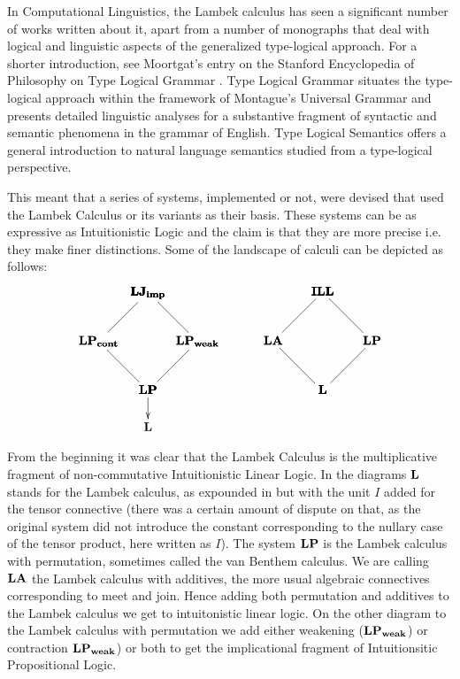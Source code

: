 \documentclass{llncs}
\begin{document}
In Computational Linguistics, the Lambek calculus 
has seen a significant number of works written
about it,  apart from a number of monographs that deal with
logical and linguistic aspects of the generalized type-logical
approach.  
For a shorter introduction, see Moortgat's entry on the Stanford Encyclopedia of Philosophy  on Type Logical Grammar \cite{MoortgatSEP}.
Type Logical Grammar situates the type-logical approach within the
framework of Montague's Universal Grammar and presents detailed
linguistic analyses for a substantive fragment of syntactic and
semantic phenomena in the grammar of English.  Type Logical Semantics offers a general introduction to natural language semantics studied from a type-logical perspective.



This meant that a series of systems, implemented or not, were devised
that used the Lambek Calculus or its variants as their basis. These
systems can be as expressive as Intuitionistic Logic and the claim is
that they are more precise i.e. they make finer distinctions. Some of
the landscape of calculi can be depicted as follows:
\[
\begin{array}{cccc}
  \bfig
  \Ctriangle/-``-/<400,400>[
    \textbf{LJ}_{\textbf{imp}}`
    \textbf{LP}_{\textbf{cont}}`
    \textbf{LP};``]

  \Dtriangle(400,0)/`-`-/<400,400>[
    \textbf{LJ}_{\textbf{imp}}`
    \textbf{LP}_{\textbf{weak}}`
    \textbf{LP};``]

  \morphism(400,0)<0,-300>[\textbf{LP}`\textbf{L};]
  \efig
  & \quad &
  \bfig
  \Ctriangle/-``-/<400,400>[
    \textbf{ILL}`
    \textbf{LA}`
    \textbf{L};``]

  \Dtriangle(400,0)/`-`-/<400,400>[
    \textbf{ILL}`
    \textbf{LP}`
    \textbf{L};``]
  \morphism(400,0)//<0,-300>[`;]
  \efig
\end{array}
\]

From the beginning it was clear that the Lambek Calculus is the
multiplicative fragment of non-commutative Intuitionistic Linear
Logic. In the diagrams $\bf L$ stands for the Lambek calculus, as
expounded in \cite{Lambek1958} but with the unit $I$ added for the
tensor connective (there was a certain amount of dispute on that, as
the original system did not introduce the constant corresponding to
the nullary case of the tensor product, here written as $I$). The
system $\bf{LP}$ is the Lambek calculus with permutation, sometimes
called the van Benthem calculus. We are calling $\bf{LA}$ the Lambek
calculus with additives, the more usual algebraic connectives
corresponding to meet and join. Hence adding both permutation and
additives to the Lambek calculus we get to intuitonistic linear
logic. On the other diagram to the Lambek calculus with permutation we
add either weakening ($\bf{LP_{weak}}$) or contraction
$\bf{LP_{weak}}$) or both to get the implicational fragment of
Intuitionsitic Propositional Logic.
\end{document}
